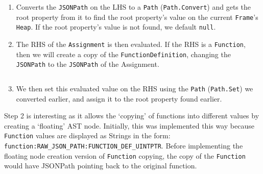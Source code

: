 \begin{enumerate}
    \item Converts the \verb|JSONPath| on the LHS to a \verb|Path| (\verb|Path.Convert|) and gets the root property from it to find the root property's value on the current \verb|Frame|'s \verb|Heap|. If the root property's value is not found, we default \verb|null|.
    \item The RHS of the \verb|Assignment| is then evaluated. If the RHS is a \verb|Function|, then we will create a copy of the \verb|FunctionDefinition|, changing the \verb|JSONPath| to the \verb|JSONPath| of the Assignment.
    \inputminted[firstline=189, lastline=202, autogobble, breaklines, tabsize=4]{go}{../../src/parser/eval.go}
    \item We then set this evaluated value on the RHS using the \verb|Path| (\verb|Path.Set|) we converted earlier, and assign it to the root property found earlier.
\end{enumerate}

Step 2 is interesting as it allows the `copying' of functions into different values by creating a `floating' AST node. Initially, this was implemented this way because \verb|Function| values are displayed as Strings in the form: \verb|function:RAW_JSON_PATH:FUNCTION_DEF_UINTPTR|. Before implementing the floating node creation version of \verb|Function| copying, the copy of the \verb|Function| would have JSONPath pointing back to the original function.
